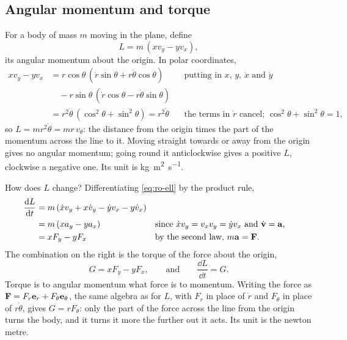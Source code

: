 \subsection*{Angular momentum and torque}

For a body of mass $m$ moving in the plane, define
\begin{equation}
   L = m\,(x v_y - y v_x) ,
   \label{eq:ro-ell}
\end{equation}
its angular momentum about the origin. In polar coordinates,
\begin{align*}
   x v_y - y v_x
   &= r\cos\theta\,(\dot{r}\sin\theta + r\dot\theta\cos\theta)
      && \text{putting in $x$, $y$, $\dot x$ and $\dot y$}\\
   &\quad - r\sin\theta\,(\dot{r}\cos\theta - r\dot\theta\sin\theta)\\
   &= r^2\dot\theta\,(\cos^2\theta + \sin^2\theta) = r^2\dot\theta
      && \text{the terms in $\dot r$ cancel; $\cos^2\theta + \sin^2\theta
      = 1$,}
\end{align*}
so $L = mr^2\dot\theta = mr\,v_\theta$: the distance from the origin times
the part of the momentum across the line to it. Moving straight towards
or away from the origin gives no angular momentum; going round it
anticlockwise gives a positive $L$, clockwise a negative one. Its unit is
\si{\kilogram\metre\squared\per\second}.

How does $L$ change? Differentiating \cref{eq:ro-ell} by the product rule,
\begin{align*}
   \frac{\mathrm{d} L}{\mathrm{d} t}
   &= m\,(\dot{x}v_y + x\dot{v}_y - \dot{y}v_x - y\dot{v}_x)\\
   &= m\,(x a_y - y a_x)
   && \text{since $\dot x v_y = v_xv_y = \dot y v_x$ and $\dot{\bm{\mathrm{v}}} =
      \bm{\mathrm{a}}$,}\\
   &= x F_y - y F_x
   && \text{by the second law, $m\bm{\mathrm{a}} = \bm{\mathrm{F}}$.}
\end{align*}
The combination on the right is the torque of the force about the origin,
\begin{equation}
   G = x F_y - y F_x , \qquad\text{and}\qquad
   \frac{\dd L}{\dd t} = G .
   \label{eq:ro-torque-plane}
\end{equation}
Torque is to angular momentum what force is to momentum. Writing the
force as $\bm{\mathrm{F}} = F_r\bm{\mathrm{e}}_r + F_\theta\bm{\mathrm{e}}_\theta$, the same algebra
as for $L$, with $F_r$ in place of $\dot r$ and $F_\theta$ in place of
$r\dot\theta$, gives $G = rF_\theta$: only the part
of the force across the line from the origin turns the body, and it turns
it more the further out it acts. Its unit is the newton metre.

